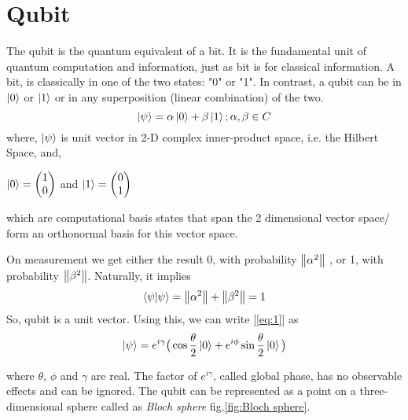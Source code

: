 \documentclass[11.5pt, paper=a4]{article}
\theoremstyle{definition}
\numberwithin{theorem}{section}
\begin{document}
\section{Qubit}
The qubit is the quantum equivalent of a bit. It is the fundamental unit of quantum computation and information, just as bit is for classical information.
A bit, is classically in one of the two states: "0" or "1". In contrast, a qubit can be in $\ket{0}$ or $\ket{1}$ or in any superposition (linear combination) of the two.
\begin{equation} \label{eq:1}
    \ket{\psi} = \alpha \ket{0} + \beta \ket{1}; \alpha, \beta \in C
\end{equation}
where, $\ket{\psi}$ is unit vector in 2-D complex inner-product space, i.e. the Hilbert Space, and, \\
\begin{center}
$\ket{0} =
\begin{pmatrix}
1 \\
0
\end{pmatrix} $ and $\ket{1} =
\begin{pmatrix}
0 \\
1
\end{pmatrix}    $
\end{center}
which are computational basis states that span the 2 dimensional vector space/ form an orthonormal basis for this vector space.

On measurement we get either the result 0, with probability  $\norm{\alpha^2}$ , or 1, with probability $\norm{\beta^2}$. Naturally, it implies
\begin{equation}
\braket{{\psi}|{\psi}}= \norm{\alpha^2}+ \norm{\beta^2} = 1
\end{equation}
So, qubit is a unit vector. Using this, we can write  [\ref{eq:1}] as
\begin{equation}
    \ket{\psi} = e^{i\gamma}\big(\cos{\frac{\theta}{2}}\ket{0} + e^{i\phi} \sin{\frac{\theta}{2}}\ket{0}\big)
\end{equation}

where $\theta$, $\phi$ and $\gamma$ are real. The factor of $e^{i\gamma}$, called global phase, has no observable effects and can be ignored. The qubit can be represented as a point on a three-dimensional sphere called as \textit{Bloch sphere} fig.\ref{fig:Bloch sphere}.
\end{document}
